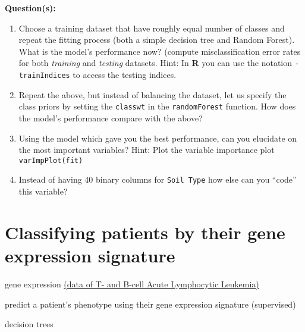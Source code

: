 \documentclass[a4paper,11pt]{article}
\begin{document}
\begin{framed}
\textbf{Question(s):}
\begin{enumerate}
	\item Choose a training dataset that have roughly equal number of classes and repeat the fitting process (both a simple decision tree 
	and Random Forest). What is the model's performance now? (compute misclassification error rates for both \textit{training} and \textit{testing} datasets.
	Hint: In \textbf{R} you can use the notation \texttt{-trainIndices} to access the testing indices.
	\item Repeat the above, but instead of balancing the dataset, let us specify the class priors by setting the \texttt{classwt} in the \texttt{randomForest} function.
	How does the model's performance compare with the above?
	\item Using the model which gave you the best performance, can you elucidate on the most important variables? 
	Hint: Plot the variable importance plot \texttt{varImpPlot(fit)} 
	\item Instead of having 40 binary columns for \texttt{Soil Type} how else can you ``code'' this variable?
\end{enumerate}
\end{framed}

\clearpage
\section{Classifying patients by their gene expression signature}
\begin{framed}
\begin{description}[leftmargin=5em,style=nextline]\addtolength{\itemsep}{-0.2\baselineskip}
	\item[Data:] gene expression \href{http://www.bioconductor.org/packages/release/data/experiment/html/ALL.html}{(data of T- and B-cell Acute Lymphocytic Leukemia)}	
	\item[Task:] predict a patient's phenotype using their gene expression signature (supervised)
	\item[Method:] decision trees
\end{description} 
\end{framed}
\end{document}
